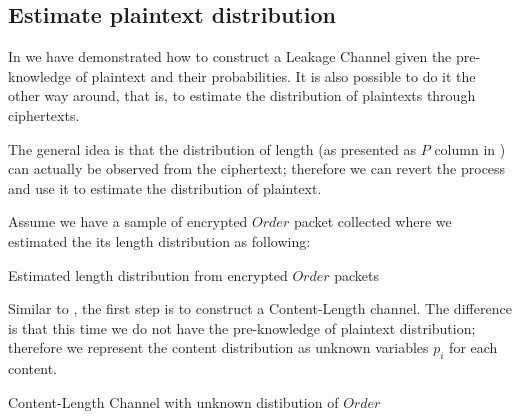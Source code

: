 \subsection{Estimate plaintext distribution}
In  we have demonstrated how to construct a Leakage Channel given the pre-knowledge of plaintext and their probabilities. It is also possible to do it the other way around, that is, to estimate the distribution of plaintexts through ciphertexts.

The general idea is that the distribution of length (as presented as $P$ column in ) can actually be observed from the ciphertext; therefore we can revert the process and use it to estimate the distribution of plaintext.

\begin{example}
Assume we have a sample of encrypted $Order$ packet collected where we estimated the its length distribution as following: 
\begin{table}[H]
\begin{center}
{}
\end{center}
\caption{Estimated length distribution from encrypted $Order$ packets}
\label{Tbl: Estimated length distribution from encrypted $Order$ packets}
\end{table}

Similar to , the first step is to construct a Content-Length channel. The difference is that this time we do not have the pre-knowledge of plaintext distribution; therefore we represent the content distribution as unknown variables $p_i$ for each content.

\begin{table}[H]
\begin{center}
{}
\end{center}
\caption{Content-Length Channel with unknown distibution of $Order$}
\label{Tbl: Content-Length Channel with unknown distibution of $Order$}
\end{table}


%


\end{example}
